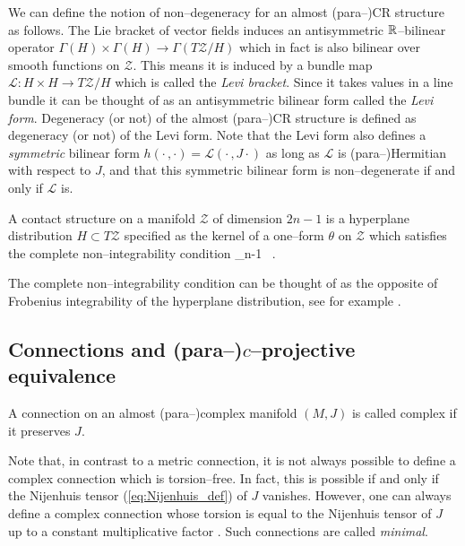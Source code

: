 We can define the notion of non--degeneracy for an almost (para--)CR structure as follows. The Lie bracket of vector fields induces an antisymmetric $\mathbb{R}$--bilinear operator $\Gamma( H )\times\Gamma( H )\rightarrow\Gamma(T\mathcal{Z}/ H )$ which in fact is also bilinear over smooth functions on $\mathcal{Z}$. This means it is induced by a bundle map $\mathcal{L}: H \times H \rightarrow T\mathcal{Z}/ H $ which is called the \textit{Levi bracket}. Since it takes values in a line bundle it can be thought of as an antisymmetric bilinear form called the \textit{Levi form}. Degeneracy (or not) of the almost (para--)CR structure is defined as degeneracy (or not) of the Levi form. Note that the Levi form also defines a \textit{symmetric} bilinear form $h(\cdot\,,\cdot)=\mathcal{L}(\cdot\,,J\cdot)$ as long as $\mathcal{L}$ is (para--)Hermitian with respect to $J$, and that this symmetric bilinear form is non--degenerate if and only if $\mathcal{L}$ is.

\begin{defi}
A contact structure on a manifold $\mathcal{Z}$ of dimension $2n-1$ is a hyperplane distribution $ H \subset T\mathcal{Z}$ specified as the kernel of a one--form $\theta$ on $\mathcal{Z}$ which satisfies the complete non--integrability condition
\be \label{eq:non_integrability}
\theta\wedge {}_{n-1\ } .
\ee
\end{defi}


The complete non--integrability condition can be thought of as the opposite of Frobenius integrability of the hyperplane distribution, see for example \cite{arnold}.


\subsection{Connections and (para--)$c$--projective equivalence}

\begin{defi}
A connection on an almost (para--)complex manifold $(M,J)$ is called complex if it preserves $J$.
\end{defi}

Note that, in contrast to a metric connection, it is not always possible to define a complex connection which is torsion--free. In fact, this is possible if and only if the Nijenhuis tensor (\ref{eq:Nijenhuis_def}) of $J$ vanishes. However, one can always define a complex connection whose torsion is equal to the Nijenhuis tensor of $J$ up to a constant multiplicative factor \cite{c_proj}. Such connections are called \textit{minimal}.

